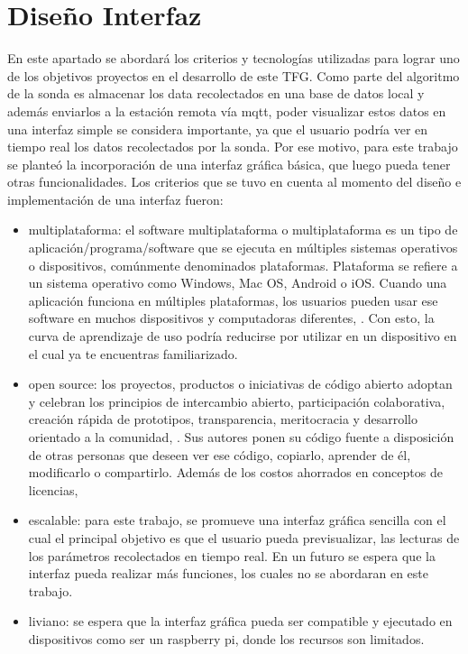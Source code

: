 
\section{Dise\~no Interfaz}
En este apartado se abordar\'a los criterios y tecnolog\'ias utilizadas para lograr uno de los objetivos proyectos en el desarrollo de este TFG. Como parte del algoritmo de la sonda es almacenar los data recolectados en una base de datos local y además enviarlos a la estación remota vía mqtt, poder visualizar estos datos en una interfaz simple se considera importante, ya que el usuario podr\'ia ver en tiempo real los datos recolectados por la sonda. Por ese motivo, para este trabajo se plante\'o la incorporación de una interfaz gráfica básica, que luego pueda tener otras funcionalidades.
Los criterios que se tuvo en cuenta al momento del diseño e implementación de una interfaz fueron:
\begin{itemize}
    \item multiplataforma: el software multiplataforma o multiplataforma es un tipo de aplicación/programa/software que se ejecuta en múltiples sistemas operativos o dispositivos, comúnmente denominados plataformas. Plataforma se refiere a un sistema operativo como Windows, Mac OS, Android o iOS. Cuando una aplicación funciona en múltiples plataformas, los usuarios pueden usar ese software en muchos dispositivos y computadoras diferentes, \cite{roca_que_2020}. Con esto, la curva de aprendizaje de uso podría reducirse por utilizar en un dispositivo en el cual ya te encuentras familiarizado. 
    \item open source: los proyectos, productos o iniciativas de código abierto adoptan y celebran los principios de intercambio abierto, participación colaborativa, creación rápida de prototipos, transparencia, meritocracia y desarrollo orientado a la comunidad, \cite{opensourcecom_camino_nodate}. Sus autores ponen su código fuente a disposición de otras personas que deseen ver ese código, copiarlo, aprender de él, modificarlo o compartirlo. Adem\'as de los costos ahorrados en conceptos de licencias,   
    \item escalable: para este trabajo, se promueve una interfaz gr\'afica sencilla con el cual el principal objetivo es que el usuario pueda previsualizar, las lecturas de los par\'ametros recolectados en tiempo real. En un futuro se espera que la interfaz pueda realizar m\'as funciones, los cuales no se abordaran en este trabajo.
    \item liviano: se espera que la interfaz gr\'afica pueda ser compatible y ejecutado en dispositivos como ser un raspberry pi, donde los recursos son limitados.
\end{itemize}
